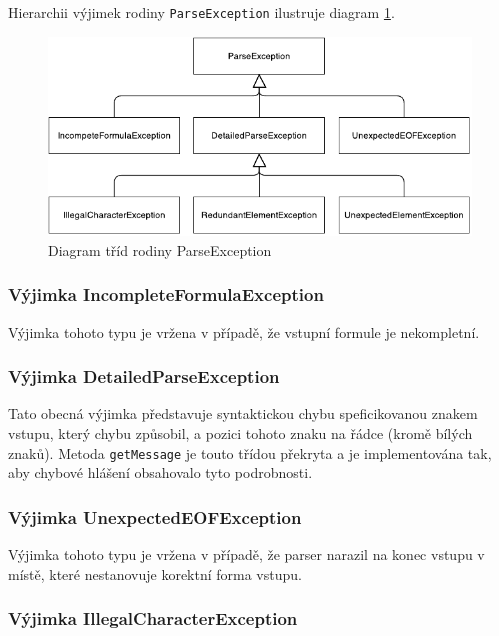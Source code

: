 \documentclass[thesis=B,czech,hidelinks]{thesis}[2012/06/26]
\begin{document}
Hierarchii výjimek rodiny \texttt{ParseException} ilustruje diagram \ref{fig:parse_exception}.

\begin{figure}
\centering
\caption{Diagram tříd rodiny ParseException}
\label{fig:parse_exception}
\includegraphics[width=\linewidth]{diagrams/parse_exception}
\end{figure}

\subsubsection{Výjimka IncompleteFormulaException}

Výjimka tohoto typu je vržena v případě, že vstupní formule je nekompletní.

\subsubsection{Výjimka DetailedParseException}

Tato obecná výjimka představuje syntaktickou chybu speficikovanou znakem vstupu, který chybu způsobil, a pozici tohoto znaku na řádce (kromě bílých znaků). Metoda \texttt{getMessage} je touto třídou překryta a je implementována tak, aby chybové hlášení obsahovalo tyto podrobnosti.

\subsubsection{Výjimka UnexpectedEOFException}

Výjimka tohoto typu je vržena v případě, že parser narazil na konec vstupu v místě, které nestanovuje korektní forma vstupu.

\subsubsection{Výjimka IllegalCharacterException}
\end{document}
